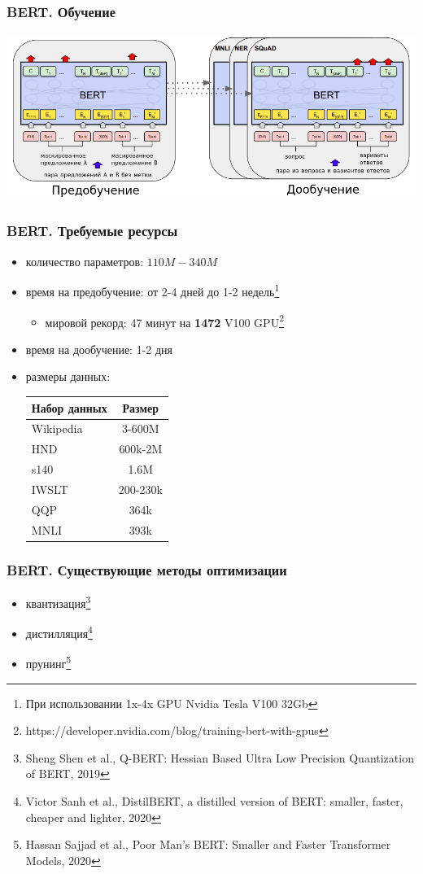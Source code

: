 \documentclass{beamer}
\begin{document}
\begin{frame}
	\frametitle{BERT. Обучение}
	\begin{center}
		\includegraphics[scale=0.45]{bert_train.png}
	\end{center}
\end{frame}

\begin{frame}
	\frametitle{BERT. Требуемые ресурсы}
	\begin{itemize}
		\item количество параметров: $110M - 340M$
		\item время на предобучение: от 2-4 дней до 1-2 недель\footnote[1]{При использовании 1x-4x GPU Nvidia Tesla V100 32Gb}
		\begin{itemize}
			\item мировой рекорд: 47 минут на {\bf 1472} V100 GPU\footnote[2]{https://developer.nvidia.com/blog/training-bert-with-gpus}
		\end{itemize}
		\item время на дообучение: 1-2 дня
		\item размеры данных:
			\begin{table}
				\begin{tabular}{l|c}
					Набор данных & Размер \\
					\hline\hline
					Wikipedia & 3-600M \\
					HND & 600k-2M \\
					s140 & 1.6M \\
					IWSLT & 200-230k \\
					QQP & 364k \\
					MNLI & 393k \\
				\end{tabular}
			\end{table}
	\end{itemize}
\end{frame}

\begin{frame}
	\frametitle{BERT. Существующие методы оптимизации}
	\begin{itemize}
		\item квантизация\footnote[1]{Sheng Shen et al., Q-BERT: Hessian Based Ultra Low Precision Quantization of BERT, 2019}
		\item дистилляция\footnote[2]{Victor Sanh et al., DistilBERT, a distilled version of BERT: smaller, faster, cheaper and lighter, 2020}
		\item прунинг\footnote[3]{Hassan Sajjad et al., Poor Man’s BERT: Smaller and Faster Transformer Models, 2020}
	\end{itemize}
\end{frame}
\end{document}
